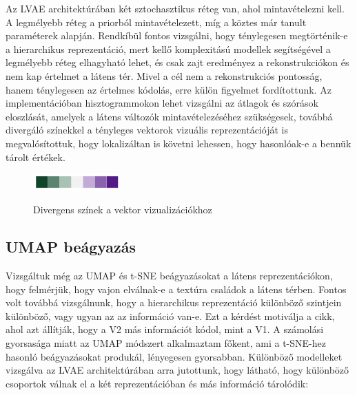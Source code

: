 \documentclass[12pt, english]{article}
\begin{document}
\vspace{4mm}

\par Az LVAE architektúrában két sztochasztikus réteg van, ahol mintavételezni kell. A legmélyebb réteg a priorból mintavételezett, míg a köztes már tanult paraméterek alapján. Rendkíbül fontos vizsgálni, hogy ténylegesen megtörténik-e a hierarchikus reprezentáció, mert kellő komplexitású modellek segítségével a legmélyebb réteg elhagyható lehet, és csak zajt eredményez a rekonstrukciókon és nem kap értelmet a látens tér. Mivel a cél nem a rekonstrukciós pontosság, hanem ténylegesen az értelmes kódolás, erre külön figyelmet fordítottunk. Az implementációban hisztogrammokon lehet vizsgálni az átlagok és szórások eloszlását, amelyek a látens változók mintavételezéséhez szükségesek, továbbá divergáló színekkel a tényleges vektorok vizuális reprezentációját is megvalósítottuk, hogy lokalizáltan is követni lehessen, hogy hasonlóak-e a bennük tárolt értékek.

\vspace{4mm}

\begin{figure}[H]
    \centering
    \includegraphics[width=0.3\textwidth]{diverging_color.png}
    \label{fig:diverging_colors}
    \caption{Divergens színek a vektor vizualizációkhoz}
\end{figure}

\vspace{4mm}

\subsection{UMAP beágyazás}

\vspace{4mm}

\par Vizsgáltuk még az UMAP \cite{mcinnes2018umap} és t-SNE \cite{maaten2008visualizing} beágyazásokat a látens reprezentációkon, hogy felmérjük, hogy vajon elválnak-e a textúra családok a látens térben. Fontos volt továbbá vizsgálnunk, hogy a hierarchikus reprezentáció különböző szintjein különböző, vagy ugyan az az információ van-e. Ezt a kérdést motiválja a \cite{ZiembaV2} cikk, ahol azt állítják, hogy a V2 más információt kódol, mint a V1. A számolási gyorsasága miatt az UMAP módszert alkalmaztam főkent, ami a t-SNE-hez hasonló beágyazásokat produkál, lényegesen gyorsabban. Különböző modelleket vizsgálva az LVAE architektúrában arra jutottunk, hogy látható, hogy különböző csoportok válnak el a két reprezentációban és más információ tárolódik:
\end{document}
